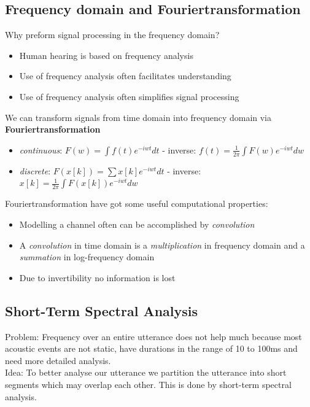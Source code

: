 \documentclass[11pt]{article}
\begin{document}
\subsection{Frequency domain and Fouriertransformation}
Why preform signal processing in the frequency domain?
\begin{itemize}
\item Human hearing is based on frequency analysis
\item Use of frequency analysis often facilitates understanding
\item Use of frequency analysis often simplifies signal processing
\end{itemize}

We can transform signals from time domain into frequency domain via \textbf{Fouriertransformation} 
\begin{itemize}
\item \emph{continuous}: $F\left(w\right) = \int f\left(t\right)e^{-iwt}dt$ - inverse: $f\left(t\right) = \frac{1}{2\pi}\int F\left(w\right)e^{-iwt}dw$ 
\item \emph{discrete}: $F\left(x\left[k\right]\right) = \sum x\left[k\right]e^{-iwt}dt$ - inverse: $x\left[k\right] = \frac{1}{2\pi}\int F\left(x\left[k\right]\right)e^{-iwt}dw$ 
\end{itemize}
Fouriertransformation have got some useful computational properties:
\begin{itemize}
\item Modelling a channel often can be accomplished by \emph{convolution}
\item A \emph{convolution} in time domain is a \emph{multiplication} in frequency domain and a \emph{summation} in log-frequency domain
\item Due to invertibility no information is lost
\end{itemize}


\subsection{Short-Term Spectral Analysis}

Problem: Frequency over an entire utterance does not help much because most acoustic events are not static, have durations in the range of 10 to 100ms and need more detailed analysis.  \\

Idea: To better analyse our utterance we partition the utterance into short segments which may overlap each other. This is done by short-term spectral analysis. \\
\end{document}
